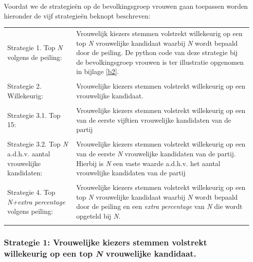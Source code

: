 \noindent Voordat we de strategie\"{e}n op de bevolkingsgroep vrouwen gaan toepassen worden hieronder de vijf strategie\"{e}n beknopt beschreven:\\


\noindent\begin{tabularx}{\textwidth}{LI}
  Strategie 1. Top \textit{N} volgens de peiling: & Vrouwelijk kiezers stemmen volstrekt willekeurig op een top \textit{N}  vrouwelijke kandidaat waarbij \textit{N} wordt bepaald door de peiling. De python code van deze strategie bij de bevolkingsgroep vrouwen is ter illustratie opgenomen in bijlage \ref{b2}.\\
  \\
  Strategie 2. Willekeurig: & Vrouwelijke kiezers stemmen volstrekt willekeurig op een vrouwelijke kandidaat.\\
\\
  Strategie 3.1. Top 15: & Vrouwelijke kiezers stemmen volstrekt willekeurig op een van de eerste vijftien vrouwelijke kandidaten van de partij \\
\\  
  Strategie 3.2. Top \textit{N} a.d.h.v. aantal vrouwelijke kandidaten: & Vrouwelijke kiezers stemmen volstrekt willekeurig op een van de eerste \textit{N} vrouwelijke kandidaten van de partij. Hierbij is \textit{N} een vaste waarde a.d.h.v. het aantal vrouwelijke kandidaten van de partij\\
  \\
  Strategie 4. Top \textit{N+extra percentage} volgens peiling: & Vrouwelijke kiezers stemmen volstrekt willekeurig op een top \textit{N} vrouwelijke kandidaat waarbij \textit{N} wordt bepaald door de peiling en een \textit{extra percentage} van \textit{N} die wordt opgeteld bij \textit{N}. \\\\
\end{tabularx}




\newpage
\subsubsection{Strategie 1: Vrouwelijke kiezers stemmen volstrekt willekeurig op een top \textit{N} vrouwelijke kandidaat.} \label{S1V}



